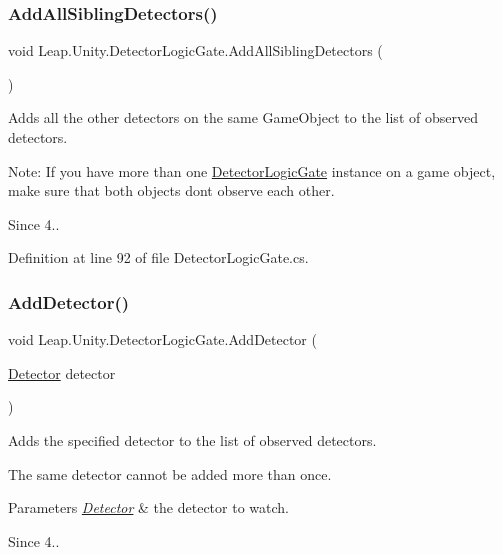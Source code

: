 \subsubsection{\texorpdfstring{AddAllSiblingDetectors()}{AddAllSiblingDetectors()}}
{\footnotesize\ttfamily void Leap.\+Unity.\+Detector\+Logic\+Gate.\+Add\+All\+Sibling\+Detectors (\begin{DoxyParamCaption}{ }\end{DoxyParamCaption})}

Adds all the other detectors on the same Game\+Object to the list of observed detectors.

Note\+: If you have more than one \mbox{\hyperlink{class_leap_1_1_unity_1_1_detector_logic_gate}{Detector\+Logic\+Gate}} instance on a game object, make sure that both objects don\textquotesingle{}t observe each other. \begin{DoxySince}{Since}
4.. 
\end{DoxySince}


Definition at line 92 of file Detector\+Logic\+Gate.\+cs.

\mbox{\label{class_leap_1_1_unity_1_1_detector_logic_gate_af4ae12b9708b39ea714111658a70c2df}} 
\subsubsection{\texorpdfstring{AddDetector()}{AddDetector()}}
{\footnotesize\ttfamily void Leap.\+Unity.\+Detector\+Logic\+Gate.\+Add\+Detector (\begin{DoxyParamCaption}\item[{\mbox{\hyperlink{class_leap_1_1_unity_1_1_detector}{Detector}}}]{detector }\end{DoxyParamCaption})}

Adds the specified detector to the list of observed detectors.

The same detector cannot be added more than once. 
\begin{DoxyParams}{Parameters}
{\em \mbox{\hyperlink{class_leap_1_1_unity_1_1_detector}{Detector}}} & the detector to watch. \\
\hline
\end{DoxyParams}
\begin{DoxySince}{Since}
4.. 
\end{DoxySince}


